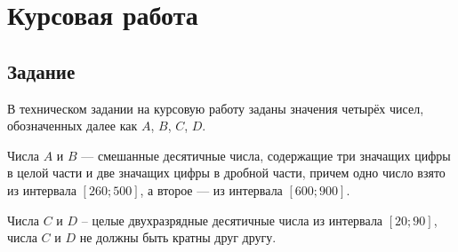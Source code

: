 \chapter{Курсовая работа}
\label{ch::courcework}

\section{Задание}

В техническом задании на курсовую работу заданы значения четырёх чисел, обозначенных далее как $A$, $B$, $C$, $D$.

Числа $A$ и $B$ --- смешанные десятичные числа, содержащие три значащих цифры в целой части и две значащих цифры в дробной части, причем одно число взято из интервала $[260;500]$, а второе --- из интервала $[600;900]$.

Числа $C$ и $D$ – целые двухразрядные десятичные числа из интервала $[20;90]$, числа $C$ и $D$ не должны быть кратны друг другу.


